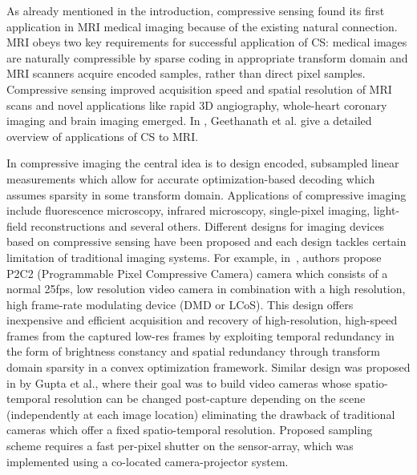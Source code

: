 \documentclass[journal]{IEEEtran}
\begin{document}
As already mentioned in the introduction, compressive sensing found its first application in MRI medical imaging because of the existing natural connection. MRI obeys two key requirements for successful application of CS: medical images are naturally compressible by sparse coding in appropriate transform domain and MRI scanners acquire encoded samples, rather than direct pixel samples. Compressive sensing improved acquisition speed and spatial resolution of MRI scans and novel applications like rapid 3D angiography, whole-heart coronary imaging and brain imaging emerged. In \cite{Geethanath2013}, Geethanath et al. give a detailed overview of applications of CS to MRI.

In compressive imaging the central idea is to design encoded, subsampled linear measurements which allow for accurate optimization-based decoding which assumes sparsity in some transform domain. Applications of compressive imaging include fluorescence microscopy, infrared microscopy, single-pixel imaging, light-field reconstructions and several others. Different designs for imaging devices based on compressive sensing have been proposed and each design tackles certain limitation of traditional imaging systems. For example, in~\cite{Reddy2011}, authors propose P2C2 (Programmable Pixel Compressive Camera) camera which consists of a normal 25fps, low resolution video camera in combination with a high resolution, high frame-rate modulating device (DMD or LCoS). This design offers inexpensive and efficient acquisition and recovery of high-resolution, high-speed frames from the captured low-res frames by exploiting temporal redundancy in the form of brightness constancy and spatial redundancy through transform domain sparsity in a convex optimization framework. Similar design was proposed in \cite{Gupta2010} by Gupta et al., where their goal was to build video cameras whose spatio-temporal resolution can be changed post-capture depending on the scene (independently at each image location) eliminating the drawback of traditional cameras which offer a fixed spatio-temporal resolution. Proposed sampling scheme requires a fast per-pixel shutter on the sensor-array, which was implemented using a co-located camera-projector system. 
%
%	
%	
\end{document}
